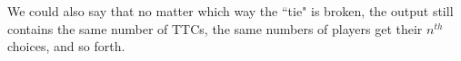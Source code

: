 \documentclass{article}
\begin{document}
\begin{enumerate}
\begin{enumerate}
  We could also say that no matter which way the ``tie" is broken, the output still contains the same number of TTCs, the same numbers of players get their $n^{th}$ choices, and so forth. \\
  \end{enumerate}
%
\end{enumerate}
%
\end{document}
